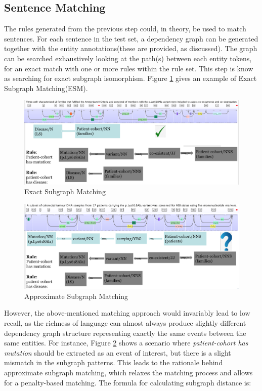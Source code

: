 \subsection{Sentence Matching}
The rules generated from the previous step could, in theory, be used to match sentences. For each sentence in the test set, a dependency graph can be generated together with the entity annotations(these are provided, as discussed). The graph can be searched exhaustively looking at the path(s) between each entity tokens, for an exact match with one or more rules within the rule set. This step is know as searching for exact subgraph isomorphism. Figure \ref{fig:ESM} gives an example of Exact Subgraph Matching(ESM).\newline\newline
\begin{figure}[h]
	\centering
	\includegraphics[width=\textwidth]{ESM}
	\caption{Exact Subgraph Matching}
	\label{fig:ESM}   
\end{figure}
\begin{figure}[h]
	\centering
	\includegraphics[width=\textwidth]{ASM}
	\caption{Approximate Subgraph Matching}
	\label{fig:ASM}   
\end{figure}
However, the above-mentioned matching approach would invariably lead to low recall, as the richness of language can almost always produce slightly different dependency graph structure representing exactly the same events between the same entities. For instance, Figure \ref{fig:ASM} shows a scenario where \emph{patient-cohort has mutation} should be extracted as an event of interest, but there is a slight mismatch in the subgraph patterns. This leads to the rationale behind approximate subgraph matching, which relaxes the matching process and allows for a penalty-based matching. The formula for calculating subgraph distance is: 
